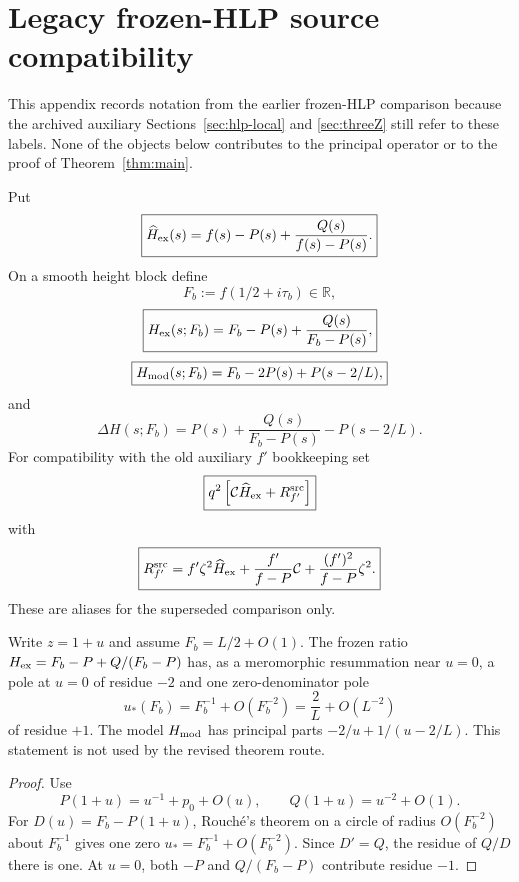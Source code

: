 \section{Legacy frozen-HLP source compatibility}
\label{sec:legacy-frozen-hlp}

This appendix records notation from the earlier frozen-HLP comparison because
the archived auxiliary Sections~\ref{sec:hlp-local} and
\ref{sec:threeZ} still refer to these labels.  None of the objects below
contributes to the principal operator or to the proof of
Theorem~\ref{thm:main}.

Put
\begin{equation}
\boxed{
\widehat H_{\rm ex}(s)
=f(s)-P(s)+\frac{Q(s)}{f(s)-P(s)}.
}
\label{eq:Hex-variable}
\end{equation}
On a smooth height block define
\begin{equation}
\boxed{F_b:=f(1/2+i\tau_b)\in\mathbb R,}
\label{eq:Fb-real-freeze}
\end{equation}
\begin{equation}
\boxed{H_{\rm ex}(s;F_b)=F_b-P(s)+\frac{Q(s)}{F_b-P(s)},}
\label{eq:Hex}
\end{equation}
\begin{equation}
\boxed{H_{\rm mod}(s;F_b)=F_b-2P(s)+P(s-2/L),}
\label{eq:Hmod}
\end{equation}
and
\begin{equation}
\boxed{
\Delta H(s;F_b)
=P(s)+\frac{Q(s)}{F_b-P(s)}-P(s-2/L).
}
\label{eq:deltaH}
\end{equation}
For compatibility with the old auxiliary $f'$ bookkeeping set
\begin{equation}
\boxed{q^2\left[\mathcal C\widehat H_{\rm ex}+R_{f'}^{\rm src}\right]}
\label{eq:exact-fprime-separation}
\end{equation}
with
\begin{equation}
\boxed{
R_{f'}^{\rm src}
=f'\zeta^2\widehat H_{\rm ex}
+\frac{f'}{f-P}\mathcal C
+\frac{(f')^2}{f-P}\zeta^2.
}
\label{eq:fprime-source}
\end{equation}
These are aliases for the superseded comparison only.

\begin{lemma}
\label{lem:principal-pole-cluster}
Write $z=1+u$ and assume $F_b=L/2+O(1)$.  The frozen ratio
$H_{\rm ex}=F_b-P+Q/(F_b-P)$ has, as a meromorphic resummation near $u=0$,
a pole at $u=0$ of residue $-2$ and one zero-denominator pole
\[
u_*(F_b)=F_b^{-1}+O(F_b^{-2})=\frac2L+O(L^{-2})
\]
of residue $+1$.  The model $H_{\rm mod}$ has principal parts
$-2/u+1/(u-2/L)$.  This statement is not used by the revised theorem route.
\end{lemma}

\begin{proof}
Use
\[
P(1+u)=u^{-1}+p_0+O(u),
\qquad
Q(1+u)=u^{-2}+O(1).
\]
For $D(u)=F_b-P(1+u)$, Rouch\'e's theorem on a circle of radius
$O(F_b^{-2})$ about $F_b^{-1}$ gives one zero
$u_*=F_b^{-1}+O(F_b^{-2})$. Since $D'=Q$, the residue of $Q/D$ there is one.
At $u=0$, both $-P$ and $Q/(F_b-P)$ contribute residue $-1$.
\end{proof}

